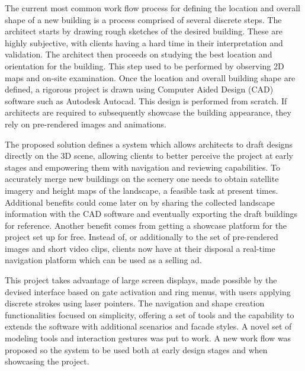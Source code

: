 
The current most common work flow process for defining the location and overall shape
of a new building is a process comprised of several discrete steps.
The architect starts by drawing rough sketches of the desired building.
These are highly subjective, with clients having a hard time in their interpretation and validation.
The architect then proceeds on studying the best location and orientation for the building.
This step used to be performed by observing 2D maps and on-site examination.
Once the location and overall building shape are defined, a rigorous project is drawn using
Computer Aided Design (CAD) software such as Autodesk Autocad\cite{SITE-AUTOCAD}.
This design is performed from scratch.
If architects are required to subsequently showcase the building appearance,
they rely on pre-rendered images and animations.



The proposed solution defines a system which allows architects to draft designs
directly on the 3D scene, allowing clients to better perceive the project at early stages
and empowering them with navigation and reviewing capabilities.
To accurately merge new buildings on the scenery one needs to obtain
satellite imagery and height maps of the landscape, a feasible task at present times.
Additional benefits could come later on by sharing the collected landscape information
with the CAD software and eventually exporting the draft buildings for reference.
Another benefit comes from getting a showcase platform for the project set up for free.
Instead of, or additionally to the set of pre-rendered images and short video clips,
clients now have at their disposal a real-time navigation platform which can be used
as a selling ad.



This project takes advantage of large screen displays,
made possible by the devised interface based on gate activation and ring menus,
with users applying discrete strokes using laser pointers.
The navigation and shape creation functionalities focused on simplicity,
offering a set of tools and the capability to extends the software with additional scenarios and facade styles.
A novel set of modeling tools and interaction gestures was put to work.
A new work flow was proposed so the system to be used both at early design stages and
when showcasing the project.

